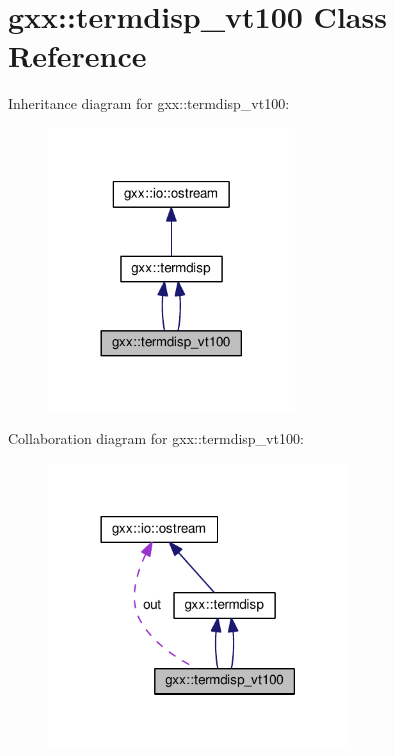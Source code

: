 \hypertarget{classgxx_1_1termdisp__vt100}{}\section{gxx\+:\+:termdisp\+\_\+vt100 Class Reference}
\label{classgxx_1_1termdisp__vt100}


Inheritance diagram for gxx\+:\+:termdisp\+\_\+vt100\+:
\nopagebreak
\begin{figure}[H]
\begin{center}
\leavevmode
\includegraphics[width=185pt]{classgxx_1_1termdisp__vt100__inherit__graph}
\end{center}
\end{figure}


Collaboration diagram for gxx\+:\+:termdisp\+\_\+vt100\+:
\nopagebreak
\begin{figure}[H]
\begin{center}
\leavevmode
\includegraphics[width=225pt]{classgxx_1_1termdisp__vt100__coll__graph}
\end{center}
\end{figure}
